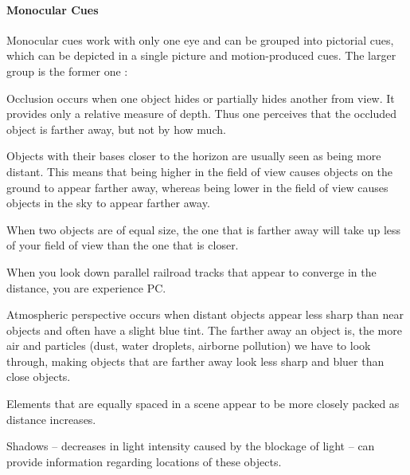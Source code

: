 \paragraph{Monocular Cues}
Monocular cues work with only one eye and can be grouped into pictorial cues, which can be depicted in a single picture and motion-produced cues.
The larger group is the former one :
\begin{my_list_desc}
	\item[Occlusion]
		Occlusion occurs when one object hides or partially hides another from view.
		It provides only a relative measure of depth.
		Thus one perceives that the occluded object is farther away, but not by how much.
	
	\item[Relative Height]
		Objects with their bases closer to the horizon are usually seen as being more distant.
		This means that being higher in the field of view causes objects on the ground to appear farther away, whereas being lower in the field of view causes objects in the sky to appear farther away.
	
	\item[Relative Size]
		When two objects are of equal size, the one that is farther away will take up less of your field of view than the one that is closer.
	
	\item[Perspective Convergence]
		When you look down parallel railroad tracks that appear to converge in the distance, you are experience PC.
	
	\item[Atmospheric Perspective]
		Atmospheric perspective occurs when distant objects appear less sharp than near objects and often have a slight blue tint.
		The farther away an object is, the more air and particles (dust, water droplets, airborne pollution) we have to look through, making objects that are farther away look less sharp and bluer than close objects.
	
	\item[Texture Gradient]
		Elements that are equally spaced in a scene appear to be more closely packed as distance increases.
	
	\item[Shadows]
		Shadows -- decreases in light intensity caused by the blockage of light -- can provide information regarding locations of these objects.
	
	\item[]
		
	
\end{my_list_desc}

